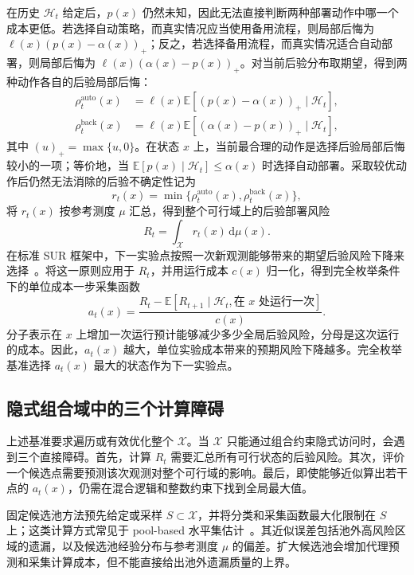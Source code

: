 \documentclass[UTF8,11pt,a4paper,fontset=none]{ctexart}
\newcommand{\X}{\mathcal X}
\newcommand{\Hh}{\mathcal H}
\newcommand{\E}{\mathbb E}
\newcommand{\1}{\mathbf 1}
\begin{document}
在历史 $\Hh_t$ 给定后，$p(x)$ 仍然未知，因此无法直接判断两种部署动作中哪一个成本更低。若选择自动策略，而真实情况应当使用备用流程，则局部后悔为 $\ell(x)(p(x)-\alpha(x))_+$；反之，若选择备用流程，而真实情况适合自动部署，则局部后悔为 $\ell(x)(\alpha(x)-p(x))_+$。对当前后验分布取期望，得到两种动作各自的后验局部后悔：
\begin{align}
  \rho_t^{\mathrm{auto}}(x)
  &=\ell(x)\E[(p(x)-\alpha(x))_+\mid\Hh_t],\\
  \rho_t^{\mathrm{back}}(x)
  &=\ell(x)\E[(\alpha(x)-p(x))_+\mid\Hh_t],
\end{align}
其中 $(u)_+=\max\{u,0\}$。在状态 $x$ 上，当前最合理的动作是选择后验局部后悔较小的一项；等价地，当 $\E[p(x)\mid\Hh_t]\leq\alpha(x)$ 时选择自动部署。采取较优动作后仍然无法消除的后验不确定性记为
\begin{equation}
  r_t(x)=\min\{\rho_t^{\mathrm{auto}}(x),
                 \rho_t^{\mathrm{back}}(x)\},
\end{equation}
将 $r_t(x)$ 按参考测度 $\mu$ 汇总，得到整个可行域上的后验部署风险
\begin{equation}
  R_t=\int_{\X}r_t(x)\,\mathrm d\mu(x).
  \label{eq:bayes-risk}
\end{equation}
在标准 SUR 框架中，下一实验点按照一次新观测能够带来的期望后验风险下降来选择~\cite{bect2012,chevalier2014}。将这一原则应用于 $R_t$，并用运行成本 $c(x)$ 归一化，得到完全枚举条件下的单位成本一步采集函数
\begin{equation}
  a_t(x)=
  \frac{R_t-\E[R_{t+1}\mid\Hh_t,\text{在 }x\text{ 处运行一次}]}{c(x)}.
  \label{eq:point-acquisition}
\end{equation}
分子表示在 $x$ 上增加一次运行预计能够减少多少全局后验风险，分母是这次运行的成本。因此，$a_t(x)$ 越大，单位实验成本带来的预期风险下降越多。完全枚举基准选择 $a_t(x)$ 最大的状态作为下一实验点。

\subsection{隐式组合域中的三个计算障碍}

上述基准要求遍历或有效优化整个 $\X$。当 $\X$ 只能通过组合约束隐式访问时，会遇到三个直接障碍。首先，计算 $R_t$ 需要汇总所有可行状态的后验风险。其次，评价一个候选点需要预测该次观测对整个可行域的影响。最后，即使能够近似算出若干点的 $a_t(x)$，仍需在混合逻辑和整数约束下找到全局最大值。

固定候选池方法预先给定或采样 $S\subset\X$，并将分类和采集函数最大化限制在 $S$ 上；这类计算方式常见于 pool-based 水平集估计~\cite{gotovos2013,lyu2021}。其近似误差包括池外高风险区域的遗漏，以及候选池经验分布与参考测度 $\mu$ 的偏差。扩大候选池会增加代理预测和采集计算成本，但不能直接给出池外遗漏质量的上界。
\end{document}
